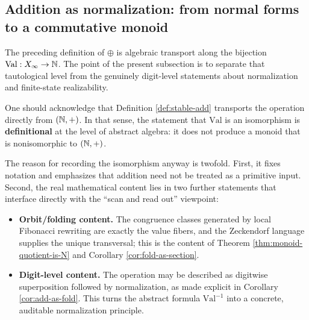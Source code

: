 \subsection{Addition as normalization: from normal forms to a commutative monoid}\label{subsec:emergent-arithmetic-stable-add}

The preceding definition of \(\oplus\) is algebraic transport along the bijection \(\mathrm{Val}:X_\infty\to\mathbb{N}\). The point of the present subsection is to separate that tautological level from the genuinely digit-level statements about normalization and finite-state realizability.

\begin{remark}\label{rem:arith-not-novel-as-abstract}
One should acknowledge that Definition \ref{def:stable-add} transports the operation directly from \((\mathbb{N},+)\). In that sense, the statement that \(\mathrm{Val}\) is an isomorphism is \textbf{definitional} at the level of abstract algebra: it does not produce a monoid that is nonisomorphic to \((\mathbb{N},+)\).

The reason for recording the isomorphism anyway is twofold. First, it fixes notation and emphasizes that addition need not be treated as a primitive input. Second, the real mathematical content lies in two further statements that interface directly with the ``scan and read out'' viewpoint:
\begin{itemize}
  \item \textbf{Orbit/folding content.} The congruence classes generated by local Fibonacci rewriting are exactly the value fibers, and the Zeckendorf language supplies the unique transversal; this is the content of Theorem \ref{thm:monoid-quotient-is-N} and Corollary \ref{cor:fold-as-section}.
  \item \textbf{Digit-level content.} The operation may be described as digitwise superposition followed by normalization, as made explicit in Corollary \ref{cor:add-as-fold}. This turns the abstract formula \(\mathrm{Val}^{-1}\) into a concrete, auditable normalization principle.
\end{itemize}
\end{remark}

